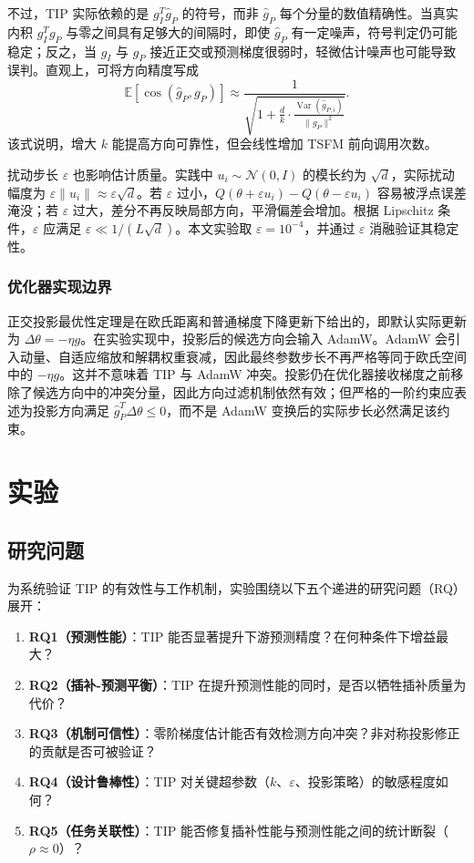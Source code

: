\documentclass{article}
\begin{document}
不过，TIP 实际依赖的是 $g_I^T\hat{g}_P$ 的符号，而非 $\hat{g}_P$ 每个分量的数值精确性。当真实内积 $g_I^Tg_P$ 与零之间具有足够大的间隔时，即使 $\hat{g}_P$ 有一定噪声，符号判定仍可能稳定；反之，当 $g_I$ 与 $g_P$ 接近正交或预测梯度很弱时，轻微估计噪声也可能导致误判。直观上，可将方向精度写成
\begin{equation}
	\mathbb{E}[\cos(\hat{g}_P, g_P)] \approx \frac{1}{\sqrt{1 + \frac{d}{k}\cdot\frac{\operatorname{Var}(\hat{g}_{P,i})}{\|g_P\|^2}}}.
\end{equation}
该式说明，增大 $k$ 能提高方向可靠性，但会线性增加 TSFM 前向调用次数。

扰动步长 $\varepsilon$ 也影响估计质量。实践中 $u_i \sim \mathcal{N}(0,I)$ 的模长约为 $\sqrt{d}$，实际扰动幅度为 $\varepsilon\|u_i\|\approx\varepsilon\sqrt{d}$。若 $\varepsilon$ 过小，$Q(\theta+\varepsilon u_i)-Q(\theta-\varepsilon u_i)$ 容易被浮点误差淹没；若 $\varepsilon$ 过大，差分不再反映局部方向，平滑偏差会增加。根据 Lipschitz 条件，$\varepsilon$ 应满足 $\varepsilon \ll 1/(L\sqrt{d})$。本文实验取 $\varepsilon=10^{-4}$，并通过 $\varepsilon$ 消融验证其稳定性。

\subsubsection{优化器实现边界}

正交投影最优性定理是在欧氏距离和普通梯度下降更新下给出的，即默认实际更新为 $\Delta\theta=-\eta g$。在实验实现中，投影后的候选方向会输入 AdamW。AdamW 会引入动量、自适应缩放和解耦权重衰减，因此最终参数步长不再严格等同于欧氏空间中的 $-\eta g$。这并不意味着 TIP 与 AdamW 冲突。投影仍在优化器接收梯度之前移除了候选方向中的冲突分量，因此方向过滤机制依然有效；但严格的一阶约束应表述为投影方向满足 $\hat{g}_P^T\Delta\theta\leq0$，而不是 AdamW 变换后的实际步长必然满足该约束。

\section{实验}

\subsection{研究问题}

为系统验证 TIP 的有效性与工作机制，实验围绕以下五个递进的研究问题（RQ）展开：

\begin{enumerate}
	\item \textbf{RQ1（预测性能）}：TIP 能否显著提升下游预测精度？在何种条件下增益最大？
	\item \textbf{RQ2（插补-预测平衡）}：TIP 在提升预测性能的同时，是否以牺牲插补质量为代价？
	\item \textbf{RQ3（机制可信性）}：零阶梯度估计能否有效检测方向冲突？非对称投影修正的贡献是否可被验证？
	\item \textbf{RQ4（设计鲁棒性）}：TIP 对关键超参数（$k$、$\varepsilon$、投影策略）的敏感程度如何？
	\item \textbf{RQ5（任务关联性）}：TIP 能否修复插补性能与预测性能之间的统计断裂（$\rho \approx 0$）？
\end{enumerate}
\end{document}
